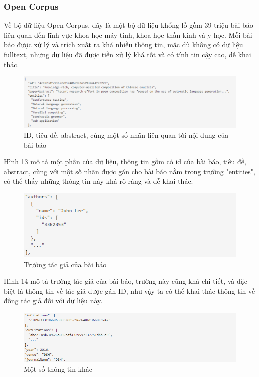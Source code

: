 \documentclass[12pt,a4paper]{article}
\begin{document}
\subsubsection{Open Corpus}
Về bộ dữ liệu Open Corpus, đây là một bộ dữ liệu khổng lồ gồm 39 triệu bài báo liên quan đến lĩnh vực khoa học máy tính, khoa học thần kinh và y học. Mỗi bài báo được xử lý và trích xuất ra khá nhiều thông tin, mặc dù không có dữ liệu fulltext, nhưng dữ liệu đã được tiền xử lý khá tốt và có tính tin cậy cao, dễ khai thác.

\begin{figure}[h]
    \centering
    \captionsetup{justification=centering}
    \includegraphics[width=1.\textwidth]{opencorpus1}
    \caption{ID, tiêu đề, abstract, cùng một số nhãn liên quan tới nội dung của bài báo}
    \label{fig:opencorpus1}
\end{figure}

\noindent
Hình 13 mô tả một phần của dữ liệu, thông tin gồm có id của bài báo, tiêu đề, abstract, cùng với một số nhãn được gán cho bài báo nằm trong trường "entities", có thể thấy những thông tin này khá rõ ràng và dễ khai thác.


\begin{figure}[h]
    \centering
    \includegraphics[width=1.\textwidth]{author}
    \caption{Trường tác giả của bài báo}
    \label{fig:author}
\end{figure}

\noindent
Hình 14 mô tả trường tác giả của bài báo, trường này cũng khá chi tiết, và đặc biệt là thông tin về tác giả được gán ID, như vậy ta có thể khai thác thông tin về đồng tác giả đối với dữ liệu này.

\begin{figure}[h]
    \centering
    \captionsetup{justification=centering}
    \includegraphics[width=1.\textwidth]{opencorpus2}
    \caption{Một số thông tin khác}
    \label{fig:opencorpus2}
\end{figure}
\end{document}
